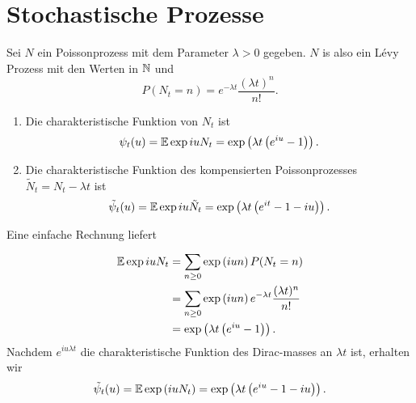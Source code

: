 \section{Stochastische Prozesse}

 Sei $N$ ein
Poissonprozess mit dem Parameter $\lambda>0$ gegeben. $N$ is also ein L\'evy
Prozess mit den Werten in $\mathbb N$ und 
\begin{equation*}
    P(N_t = n) = e^{- \lambda t} \frac{ (\lambda t)^n}{ n!}.
\end{equation*}
\begin{enumerate}
    \item Die charakteristische Funktion von $N_t$ ist 
        \begin{equation*}
            \psi_t(u) = \mathbb{E} \exp iu N_t = \exp \left( \lambda t \left( e^{iu} -1\right) \right).
        \end{equation*}
    \item Die charakteristische Funktion des kompensierten Poissonprozesses
        $\tilde N_t = N_t - \lambda t$ ist 
        \begin{equation*}
            \tilde \psi_t (u) = \mathbb{E} \exp iu \tilde N_t = 
            \exp \left( \lambda t \left( e^{it}-1-iu \right) \right). 
        \end{equation*}
\end{enumerate} 

\solution Eine einfache Rechnung liefert
\begin{align*}
    \mathbb{E} \exp iu N_t &= \sum_{n\geq 0}^{} \exp \left( iun  \right) P (N_t = n) \\
    &= \sum_{n\geq 0}^{} \exp \left( iun \right) e^{-\lambda t} \frac{(\lambda t)^n}{n!} \\
    &= \exp \left( \lambda t \left( e^{iu}-1 \right) \right). 
\end{align*}
Nachdem $e^{i u \lambda t}$ die charakteristische Funktion des Dirac-masses an 
$\lambda t$ ist, erhalten wir 
\begin{equation*}
    \tilde \psi_t(u) = \mathbb{E} \exp \left( i u N_t \right) = 
    \exp \left( \lambda t \left( e^{iu}-1-iu \right) \right). 
\end{equation*}

